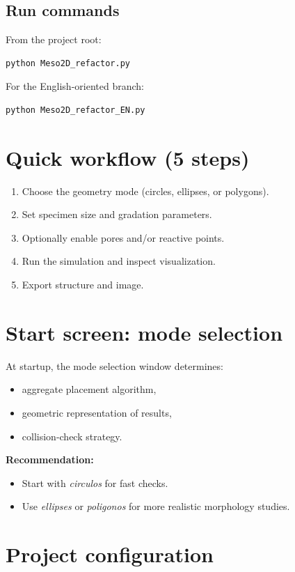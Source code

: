 \documentclass[11pt,a4paper]{article}
\begin{document}
\subsection{Run commands}
From the project root:
\begin{lstlisting}[style=cmd]
python Meso2D_refactor.py
\end{lstlisting}

For the English-oriented branch:
\begin{lstlisting}[style=cmd]
python Meso2D_refactor_EN.py
\end{lstlisting}

\section{Quick workflow (5 steps)}
\begin{enumerate}[leftmargin=1.7em]
  \item Choose the geometry mode (circles, ellipses, or polygons).
  \item Set specimen size and gradation parameters.
  \item Optionally enable pores and/or reactive points.
  \item Run the simulation and inspect visualization.
  \item Export structure and image.
\end{enumerate}

\section{Start screen: mode selection}
At startup, the mode selection window determines:
\begin{itemize}[leftmargin=1.5em]
  \item aggregate placement algorithm,
  \item geometric representation of results,
  \item collision-check strategy.
\end{itemize}

\textbf{Recommendation:}
\begin{itemize}[leftmargin=1.5em]
  \item Start with \textit{circulos} for fast checks.
  \item Use \textit{ellipses} or \textit{poligonos} for more realistic morphology studies.
\end{itemize}

\section{Project configuration}
\end{document}
